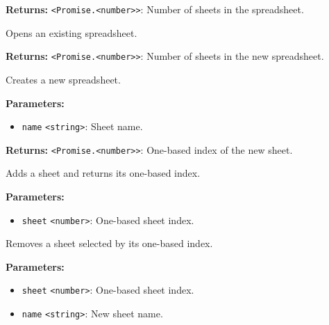 \documentclass[12pt,a4paper]{article}
\begin{document}
\noindent \textbf{Returns:} \texttt{<Promise.<number>>}: Number of sheets in the spreadsheet.

\noindent Opens an existing spreadsheet.

\vspace{5mm}
\noindent {}


\noindent \textbf{Returns:} \texttt{<Promise.<number>>}: Number of sheets in the new spreadsheet.

\noindent Creates a new spreadsheet.

\vspace{5mm}
\noindent {}


\noindent \textbf{Parameters:}
\begin{itemize}
  \item \texttt{name} \texttt{<string>}: Sheet name.
\end{itemize}

\noindent \textbf{Returns:} \texttt{<Promise.<number>>}: One-based index of the new sheet.

\noindent Adds a sheet and returns its one-based index.

\vspace{5mm}
\noindent {}


\noindent \textbf{Parameters:}
\begin{itemize}
  \item \texttt{sheet} \texttt{<number>}: One-based sheet index.
\end{itemize}

\noindent Removes a sheet selected by its one-based index.

\vspace{5mm}
\noindent {}


\noindent \textbf{Parameters:}
\begin{itemize}
  \item \texttt{sheet} \texttt{<number>}: One-based sheet index.
  \item \texttt{name} \texttt{<string>}: New sheet name.
\end{itemize}
\end{document}

